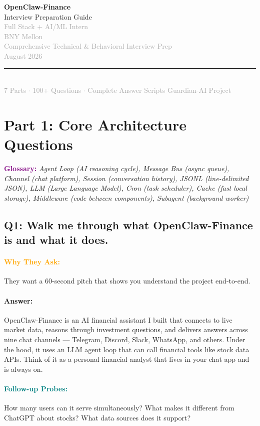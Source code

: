 \documentclass[11pt,a4paper]{article}
\newcommand{\Q}[1]{\subsection{#1}}
\newcommand{\Ans}[1]{\paragraph{\textbf{Answer:}} #1}
\newcommand{\Why}{\paragraph{\textcolor{orange}{\textbf{Why They Ask:}}}}
\newcommand{\Probe}{\paragraph{\textcolor{teal}{\textbf{Follow-up Probes:}}}}
\begin{document}
\begin{titlepage}
\centering
\vspace*{3cm}
{\Huge\bfseries\textcolor{primaryblue}{OpenClaw-Finance}}\\[0.5cm]
{\LARGE\textcolor{secondaryblue}{Interview Preparation Guide}}\\[1cm]
{\Large\textcolor{darkgray}{Full Stack + AI/ML Intern}}\\[0.3cm]
{\Large\textcolor{darkgray}{BNY Mellon}}\\[2cm]
{\large\textcolor{darkgray}{Comprehensive Technical \& Behavioral Interview Prep}}\\[0.5cm]
{\large\textcolor{darkgray}{August 2026}}\\[2cm]
\rule{0.5\textwidth}{0.5pt}\\[0.5cm]
{\small\textcolor{darkgray}{7 Parts $\cdot$ 100+ Questions $\cdot$ Complete Answer Scripts}}
\vfill
{\small\textcolor{darkgray}{Guardian-AI Project}}
\end{titlepage}

\newpage
\tableofcontents
\newpage

\section{Part 1: Core Architecture Questions}

\textcolor{purple}{\textbf{Glossary:}} \textit{Agent Loop (AI reasoning cycle), Message Bus (async queue), Channel (chat platform), Session (conversation history), JSONL (line-delimited JSON), LLM (Large Language Model), Cron (task scheduler), Cache (fast local storage), Middleware (code between components), Subagent (background worker)}

\Q{Q1: Walk me through what OpenClaw-Finance is and what it does.}
\Why They want a 60-second pitch that shows you understand the project end-to-end.
\Ans OpenClaw-Finance is an AI financial assistant I built that connects to live market data, reasons through investment questions, and delivers answers across nine chat channels --- Telegram, Discord, Slack, WhatsApp, and others. Under the hood, it uses an LLM agent loop that can call financial tools like stock data APIs. Think of it as a personal financial analyst that lives in your chat app and is always on.
\Probe How many users can it serve simultaneously? What makes it different from ChatGPT about stocks? What data sources does it support?
\end{document}
